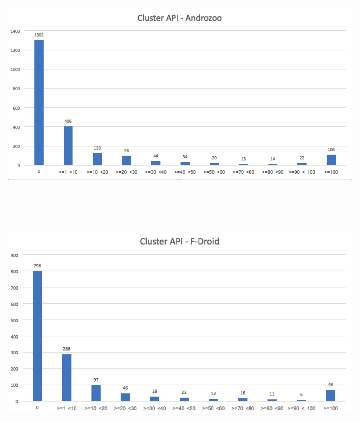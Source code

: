 \begin{figure}
    \begin{subfigure}{0.48\textwidth}
        \includegraphics[width=\textwidth]{images/cluster_api_androzoo.png}
    \end{subfigure}
    ~
    \begin{subfigure}{0.48\textwidth}
        \includegraphics[width=\textwidth]{images/cluster_api_fdroid.png}
    \end{subfigure}
    

\end{figure}
